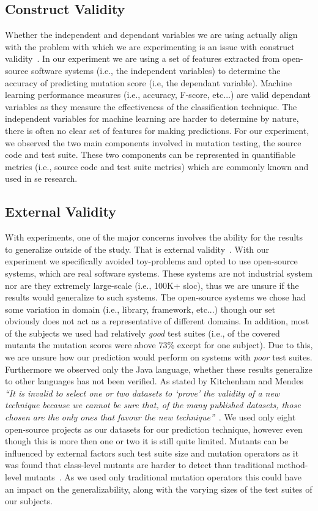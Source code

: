\subsection{Construct Validity}
\label{subsec:experiment_construct_validity}
Whether the independent and dependant variables we are using actually align with the problem with which we are experimenting is an issue with construct validity~\cite{WRH+00,WKP10}. In our experiment we are using a set of features extracted from open-source software systems (i.e., the independent variables) to determine the accuracy of predicting mutation score (i.e, the dependant variable). Machine learning performance measures (i.e., accuracy, F-score, etc...) are valid dependant variables as they measure the effectiveness of the classification technique. The independent variables for machine learning are harder to determine by nature, there is often no clear set of features for making predictions. For our experiment, we observed the two main components involved in mutation testing, the source code and test suite. These two components can be represented in quantifiable metrics (i.e., source code and test suite metrics) which are commonly known and used in \gls{se} research.


\subsection{External Validity}
\label{subsec:experiment_external_validity}
With experiments, one of the major concerns involves the ability for the results to generalize outside of the study. That is external validity~\cite{WRH+00,WKP10}. With our experiment we specifically avoided toy-problems and opted to use open-source systems, which are real software systems. These systems are not industrial system nor are they extremely large-scale (i.e., 100K+ \gls{sloc}), thus we are unsure if the results would generalize to such systems. The open-source systems we chose had some variation in domain (i.e., library, framework, etc...) though our set obviously does not act as a representative of different domains. In addition, most of the subjects we used had relatively \emph{good} test suites (i.e., of the covered mutants the mutation scores were above 73\% except for one subject). Due to this, we are unsure how our prediction would perform on systems with \emph{poor} test suites. Furthermore we observed only the Java language, whether these results generalize to other languages has not been verified. As stated by Kitchenham and Mendes \emph{``It is invalid to select one or two datasets to `prove' the validity of a new technique because we cannot be sure that, of the many published datasets, those chosen are the only ones that favour the new technique''}~\cite{KM09}. We used only eight open-source projects as our datasets for our prediction technique, however even though this is more then one or two it is still quite limited.  Mutants can be influenced by external factors such test suite size and mutation operators as it was found that class-level mutants are harder to detect than traditional method-level mutants~\cite{NK11}. As we used only traditional mutation operators this could have an impact on the generalizability, along with the varying sizes of the test suites of our subjects.

